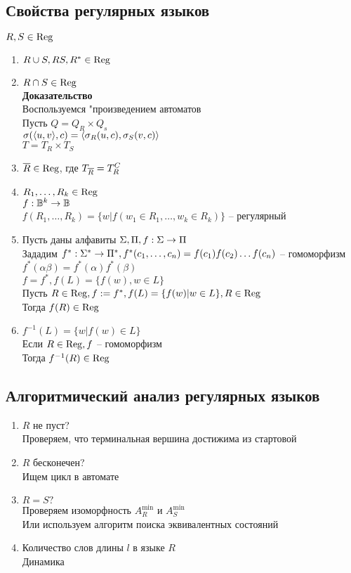 \documentclass[12pt]{article}
\begin{document}
\subsection{Свойства регулярных языков}
$R, S \in \operatorname{Reg}$
\begin{enumerate}
    \item $R\cup S, RS, R^* \in \operatorname{Reg}$
    \item $R \cap S \in \operatorname{Reg}$\\
    \textbf{Доказательство}\\
    Воспользуемся "произведением автоматов\\
    Пусть $Q = Q_R \times Q_s$\\
    $\sigma(\langle u, v \rangle, c) = \langle \sigma_R(u,c), \sigma_S(v,c) \rangle$\\
    $T = T_R \times T_S$
    \item $\overline R \in \operatorname{Reg}$, где $T_{\overline R} = T_R^C$
    \item $R_1, \ldots, R_k \in \operatorname{Reg}$\\
    $f: \mathbb{B}^k \rightarrow \mathbb{B}$\\
    $f(R_1,\ldots, R_k) = \{w| f(w_1 \in R_1, \ldots, w_k \in R_k)\}$ -- регулярный
    \item Пусть даны алфавиты $\Sigma, \Pi, f: \Sigma \rightarrow \Pi$\\
    Зададим $f^*:\Sigma^* \rightarrow \Pi^*, f^*(c_1, \ldots, c_n) = f(c_1)f(c_2)\ldots f(c_n)$ -- гомоморфизм\\
    $f^*(\alpha\beta) = f^*(\alpha)f^*(\beta)$\\
    $f = f^*, f(L) = \{f(w), w\in L\}$\\
    Пусть $R \in \operatorname{Reg}, f := f^*, f(L) = \{f(w)|w\in L\}, R \in \operatorname{Reg}$\\
    Тогда $f(R) \in \operatorname{Reg}$
    \item $f^{-1}(L) = \{w| f(w) \in L\}$\\
    Если $R \in \operatorname{Reg}, f$ -- гомоморфизм\\
    Тогда $f^{-1}(R) \in \operatorname{Reg}$
\end{enumerate}
\subsection{Алгоритмический анализ регулярных языков}
\begin{enumerate}
    \item $R$ не пуст?\\
    Проверяем, что терминальная вершина достижима из стартовой
    \item $R$ бесконечен?\\
    Ищем цикл в автомате
    \item $R = S?$\\
    Проверяем изоморфность $A^{\min}_R$ и $A^{\min}_S$\\
    Или используем алгоритм поиска эквивалентных состояний
    \item Количество слов длины $l$ в языке $R$\\
    Динамика
\end{enumerate}
\end{document}

